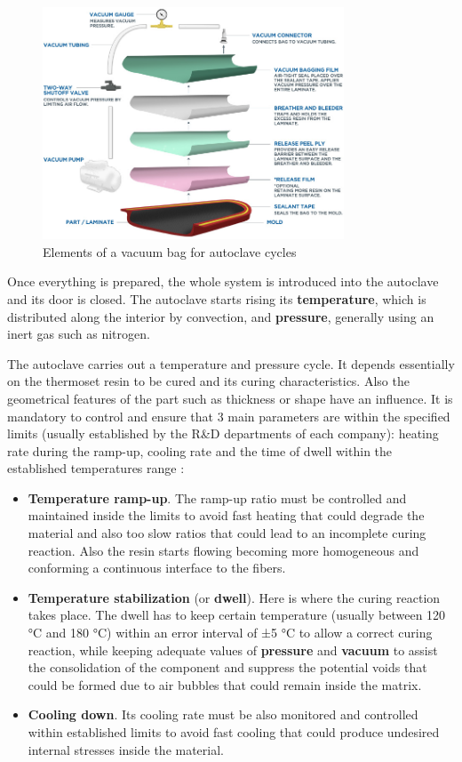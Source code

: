 \begin{figure}[h]
	\centering
	\includegraphics[width=0.8\textwidth]{img/vacuum_autoclave.png}
	\caption{Elements of a vacuum bag for autoclave cycles}
	\label{fig:autoclave_vacuum}
\end{figure}

Once everything is prepared, the whole system is introduced into the autoclave and its door is closed. The autoclave starts rising its \textbf{temperature}, which is distributed along the interior by convection, and \textbf{pressure}, generally using an inert gas such as nitrogen.

The autoclave carries out a temperature and pressure cycle. It depends essentially on the thermoset resin to be cured and its curing characteristics. Also the geometrical features of the part such as thickness or shape have an influence. It is mandatory to control and ensure that 3 main parameters are within the specified limits (usually established by the R\&D departments of each company): heating rate during the ramp-up, cooling rate and the time of dwell within the established temperatures range \cite{Nele2016}:

\begin{itemize}
\item \textbf{Temperature ramp-up}. The ramp-up ratio must be controlled and maintained inside the limits to avoid fast heating that could degrade the material and also too slow ratios that could lead to an incomplete curing reaction. Also the resin starts flowing becoming more homogeneous and conforming a continuous interface to the fibers.
\item \textbf{Temperature stabilization} (or \textbf{dwell}). Here is where the curing reaction takes place. The dwell has to keep certain temperature (usually between 120 °C and 180 °C) within an error interval of ±5 °C to allow a correct curing reaction, while keeping adequate values of \textbf{pressure} and \textbf{vacuum} to assist the consolidation of the component and suppress the potential voids that could be formed due to air bubbles that could remain inside the matrix.
\item \textbf{Cooling down}. Its cooling rate must be also monitored and controlled within established limits to avoid fast cooling that could produce undesired internal stresses inside the material.
\end{itemize}

